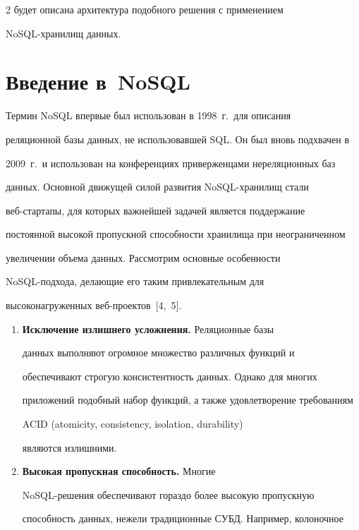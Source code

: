 \begin{multicols}{2}
будет описана архитектура подобного решения с применением 


   NoSQL-хра\-ни\-лищ данных.


   


\section{Введение в~NoSQL}





   Термин NoSQL впервые был использован в 1998~г.\ для описания 


реляционной базы данных, не использовавшей SQL. Он был вновь подхвачен в 


2009~г.\ и использован на конференциях приверженцами нереляционных баз 


данных. Основной движущей силой развития NoSQL-хра\-ни\-лищ стали 


   веб-стартапы, для которых важнейшей задачей является поддержание 


постоянной высокой пропускной способности хранилища при неограниченном 


увеличении объема данных. Рассмотрим основные особенности 


   NoSQL-под\-хо\-да, делающие его таким привлекательным для 


высоконагруженных веб-про\-ек\-тов~[4,~5].


   \begin{enumerate}[1.]


\item \textbf{Исключение излишнего усложнения.} Реляционные базы 


данных выполняют огромное множество различных функций и 


обеспечивают строгую консистентность данных. Однако для многих 


приложений подобный набор функций, а также удовлетворение требованиям 


ACID (atomicity, consistency, isolation, durability)


являются излишними.


\item \textbf{Высокая пропускная способность.} Многие 


NoSQL-ре\-ше\-ния обеспечивают гораздо более высокую пропускную 


способность данных, нежели традиционные СУБД. Например, колоночное 



\end{enumerate}
\end{multicols}
